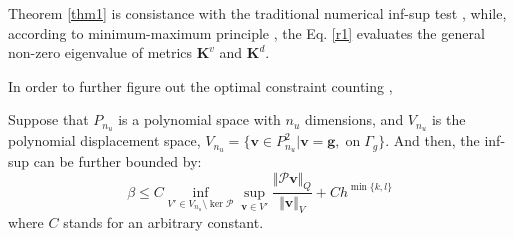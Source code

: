 \begin{rmk}
    Theorem \ref{thm1} is consistance with the traditional numerical inf-sup test \cite{malkus1981}, while, according to minimum-maximum principle \cite{babuskaa}, the Eq. \eqref{r1} evaluates the general non-zero eigenvalue of metrics $\boldsymbol K^v$ and $\boldsymbol K^d$.
\end{rmk}

In order to further figure out the optimal constraint counting ,
\begin{thm}
    Suppose that $P_{n_u}$ is a polynomial space with $n_u$ dimensions, and $V_{n_u}$ is the polynomial displacement space, $V_{n_u} = \{\boldsymbol v \in P_{n_u}^2 \vert \boldsymbol v=\boldsymbol g,\;\mathrm{on}\; \Gamma_g\}$. And then, the inf-sup can be further bounded by:
\begin{equation}\label{r2}
    \beta \le C \inf_{V'\in V_{n_u}\setminus\ker \mathcal P}\sup_{\boldsymbol v \in V'}\frac{\Vert \mathcal P \boldsymbol v\Vert_Q}{\Vert\boldsymbol v\Vert_V} + Ch^{\min\{k,l\}}
\end{equation}
where $C$ stands for an arbitrary constant.
\end{thm}
